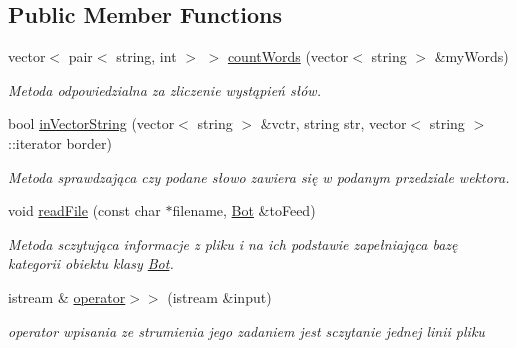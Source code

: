\subsection*{Public Member Functions}
\begin{DoxyCompactItemize}
\item 
vector$<$ pair$<$ string, int $>$ $>$ \mbox{\hyperlink{class_category_creator_af360522860174df13d38103f06024406}{count\+Words}} (vector$<$ string $>$ \&my\+Words)
\begin{DoxyCompactList}\small\item\em Metoda odpowiedzialna za zliczenie wystąpień słów. \end{DoxyCompactList}\item 
bool \mbox{\hyperlink{class_category_creator_a2c8b4f34e75ed4f6fa94ebe47a14b86d}{in\+Vector\+String}} (vector$<$ string $>$ \&vctr, string str, vector$<$ string $>$\+::iterator border)
\begin{DoxyCompactList}\small\item\em Metoda sprawdzająca czy podane słowo zawiera się w podanym przedziale wektora. \end{DoxyCompactList}\item 
void \mbox{\hyperlink{class_category_creator_a4f5b6a367857be837f587946be1cdef3}{read\+File}} (const char $\ast$filename, \mbox{\hyperlink{class_bot}{Bot}} \&to\+Feed)
\begin{DoxyCompactList}\small\item\em Metoda sczytująca informacje z pliku i na ich podstawie zapełniająca bazę kategorii obiektu klasy \mbox{\hyperlink{class_bot}{Bot}}. \end{DoxyCompactList}\item 
\mbox{\label{class_category_creator_acc39fe819a9495d14c9e260d8000be86}} 
istream \& \mbox{\hyperlink{class_category_creator_acc39fe819a9495d14c9e260d8000be86}{operator$>$$>$}} (istream \&input)
\begin{DoxyCompactList}\small\item\em operator wpisania ze strumienia jego zadaniem jest sczytanie jednej linii pliku \end{DoxyCompactList}\end{DoxyCompactItemize}

